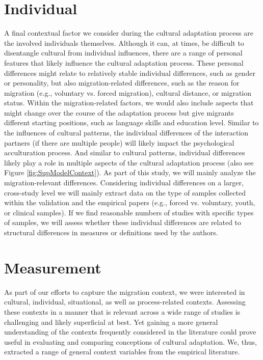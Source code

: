 \documentclass[man, 12pt, a4paper]{apa7}
\begin{document}
\section{Individual} 
A final contextual factor we consider during the cultural adaptation process are the involved individuals themselves. Although it can, at times, be difficult to disentangle cultural from individual influences, there are a range of personal features that likely influence the cultural adaptation process. These personal differences might relate to relatively stable individual differences, such as gender or personality, but also migration-related differences, such as the reason for migration (e.g., voluntary vs. forced migration), cultural distance, or migration status. Within the migration-related factors, we would also include aspects that might change over the course of the adaptation process but give migrants different starting positions, such as language skills and education level.
Similar to the influences of cultural patterns, the individual differences of the interaction partners (if there are multiple people) will likely impact the psychological acculturation process. And similar to cultural patterns, individual differences likely play a role in multiple aspects of the cultural adaptation process (also see Figure \ref{fig:SupModelContext}). As part of this study, we will mainly analyze the migration-relevant differences. Considering individual differences on a larger, cross-study level we will mainly extract data on the type of samples collected within the validation and the empirical papers (e.g., forced vs. voluntary, youth, or clinical samples). If we find reasonable numbers of studies with specific types of samples, we will assess whether these individual differences are related to structural differences in measures or definitions used by the authors.

\section{Measurement}
As part of our efforts to capture the migration context, we were interested in cultural, individual, situational, as well as process-related contexts. Assessing these contexts in a manner that is relevant across a wide range of studies is challenging and likely superficial at best. Yet gaining a more general understanding of the contexts frequently considered in the literature could prove useful in evaluating and comparing conceptions of cultural adaptation. We, thus, extracted a range of general context variables from the empirical literature.
\end{document}
